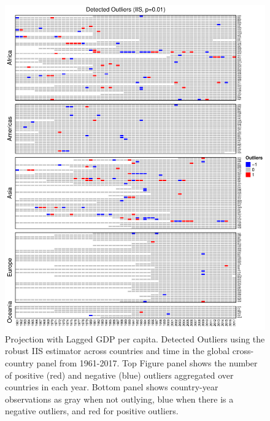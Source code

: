 \documentclass[11pt, letterpaper]{article}
\numberwithin{algorithm}{section}
\numberwithin{assumption}{section}
\numberwithin{lemma}{section}
\numberwithin{theorem}{section}
\numberwithin{corollary}{section}
\numberwithin{remark}{section}
\numberwithin{equation}{section}
\numberwithin{figure}{section}
\numberwithin{table}{section}
\begin{document}
\begin{figure}[!htbp]  \vspace{-.35in}
\centering
\includegraphics[width = \textwidth]{heat1_adapt.L1.pdf}
\caption{Projection with Lagged GDP per capita. Detected Outliers using the robust IIS estimator across countries and time in the global cross-country panel from 1961-2017. Top Figure panel shows the number of positive (red) and negative (blue) outliers aggregated over countries in each year. Bottom panel shows country-year observations as gray when not outlying, blue when there is a negative outliers, and red for positive outliers.}
\label{fig_out_app1}
\end{figure}
\end{document}
